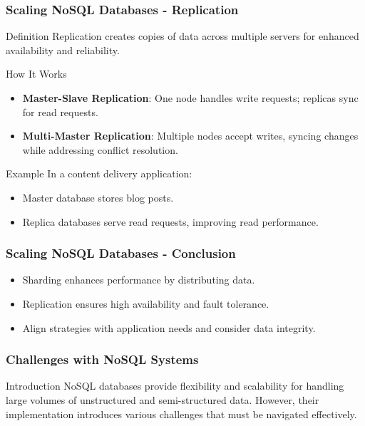 \documentclass[aspectratio=169]{beamer}
\begin{document}
\begin{frame}[fragile]
    \frametitle{Scaling NoSQL Databases - Replication}
    \begin{block}{Definition}
        Replication creates copies of data across multiple servers for enhanced availability and reliability.
    \end{block}
    
    \begin{block}{How It Works}
        \begin{itemize}
            \item \textbf{Master-Slave Replication}: One node handles write requests; replicas sync for read requests.
            \item \textbf{Multi-Master Replication}: Multiple nodes accept writes, syncing changes while addressing conflict resolution.
        \end{itemize}
    \end{block}
    
    \begin{block}{Example}
        In a content delivery application:
        \begin{itemize}
            \item Master database stores blog posts.
            \item Replica databases serve read requests, improving read performance.
        \end{itemize}
    \end{block}
\end{frame}

\begin{frame}[fragile]
    \frametitle{Scaling NoSQL Databases - Conclusion}
    \begin{itemize}
        \item Sharding enhances performance by distributing data.
        \item Replication ensures high availability and fault tolerance.
        \item Align strategies with application needs and consider data integrity.
    \end{itemize}
\end{frame}

\begin{frame}[fragile]
    \frametitle{Challenges with NoSQL Systems}
    
    \begin{block}{Introduction}
        NoSQL databases provide flexibility and scalability for handling large volumes of unstructured and semi-structured data.
        However, their implementation introduces various challenges that must be navigated effectively.
    \end{block}
\end{frame}
\end{document}
